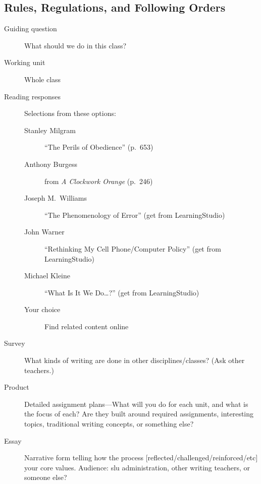 \documentclass[12pt,oneside]{amsart}	%
\begin{document}
\subsection{Rules, Regulations, and Following Orders} %
\label{sub:doing_what_we_re_told}
\begin{description}
	\item[Guiding question] What should we do in this class?
	\item [Working unit] Whole class
	\item [Reading responses] Selections from these options:
	\begin{description}
		\item[Stanley Milgram] ``The Perils of Obedience'' (p.~653)
		\item[Anthony Burgess] from \emph{A Clockwork Orange} (p.~246)
		\item[Joseph M.\ Williams] ``The Phenomenology of Error'' (get from LearningStudio)
		\item[John Warner] ``Rethinking My Cell Phone/Computer Policy'' (get from LearningStudio) %
		\item[Michael Kleine] ``What Is It We Do…?'' (get from LearningStudio)
		\item[Your choice] Find related content online
	\end{description}
	\item [Survey] What kinds of writing are done in other disciplines/classes? (Ask other teachers.)
	\item [Product] Detailed assignment plans—What will you do for each unit, and what is the focus of each? Are they built around required assignments, interesting topics, traditional writing concepts, or something else?
	\item [Essay] Narrative form telling how the process [reflected/challenged/reinforced/etc] your core values. Audience: \ac{slu} administration, other writing teachers, or someone else?
\end{description}
\end{document}
